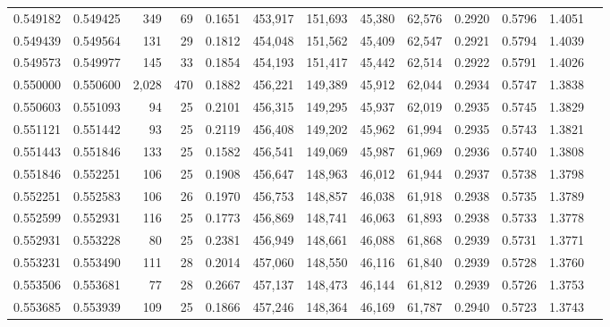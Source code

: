 \begin{tabular}{rrrrrrrrrrrrr}
0.549182 & 0.549425 &   349 &  69 &                                     0.1651 & 453,917 & 151,693 &  45,380 &  62,576 & 0.2920 & 0.5796 & 1.4051 \\
0.549439 & 0.549564 &   131 &  29 &                                     0.1812 & 454,048 & 151,562 &  45,409 &  62,547 & 0.2921 & 0.5794 & 1.4039 \\
0.549573 & 0.549977 &   145 &  33 &                                     0.1854 & 454,193 & 151,417 &  45,442 &  62,514 & 0.2922 & 0.5791 & 1.4026 \\
0.550000 & 0.550600 & 2,028 & 470 &                                     0.1882 & 456,221 & 149,389 &  45,912 &  62,044 & 0.2934 & 0.5747 & 1.3838 \\
0.550603 & 0.551093 &    94 &  25 &                                     0.2101 & 456,315 & 149,295 &  45,937 &  62,019 & 0.2935 & 0.5745 & 1.3829 \\
0.551121 & 0.551442 &    93 &  25 &                                     0.2119 & 456,408 & 149,202 &  45,962 &  61,994 & 0.2935 & 0.5743 & 1.3821 \\
0.551443 & 0.551846 &   133 &  25 &                                     0.1582 & 456,541 & 149,069 &  45,987 &  61,969 & 0.2936 & 0.5740 & 1.3808 \\
0.551846 & 0.552251 &   106 &  25 &                                     0.1908 & 456,647 & 148,963 &  46,012 &  61,944 & 0.2937 & 0.5738 & 1.3798 \\
0.552251 & 0.552583 &   106 &  26 &                                     0.1970 & 456,753 & 148,857 &  46,038 &  61,918 & 0.2938 & 0.5735 & 1.3789 \\
0.552599 & 0.552931 &   116 &  25 &                                     0.1773 & 456,869 & 148,741 &  46,063 &  61,893 & 0.2938 & 0.5733 & 1.3778 \\
0.552931 & 0.553228 &    80 &  25 &                                     0.2381 & 456,949 & 148,661 &  46,088 &  61,868 & 0.2939 & 0.5731 & 1.3771 \\
0.553231 & 0.553490 &   111 &  28 &                                     0.2014 & 457,060 & 148,550 &  46,116 &  61,840 & 0.2939 & 0.5728 & 1.3760 \\
0.553506 & 0.553681 &    77 &  28 &                                     0.2667 & 457,137 & 148,473 &  46,144 &  61,812 & 0.2939 & 0.5726 & 1.3753 \\
0.553685 & 0.553939 &   109 &  25 &                                     0.1866 & 457,246 & 148,364 &  46,169 &  61,787 & 0.2940 & 0.5723 & 1.3743 \\

\end{tabular}
